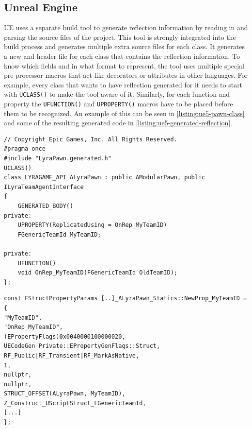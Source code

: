 \subsection{Unreal Engine}

UE uses a separate build tool to generate reflection information by reading in and parsing the \Cpp source files of the project. This tool is strongly integrated into the build process and generates multiple extra source files for each class. It generates a new \Cpp and header file for each class that contains the reflection information. To know which fields and in what format to represent, the tool uses multiple special pre-processor macros that act like decorators or attributes in other languages. For example, every class that wants to have reflection generated for it needs to start with \verb|UCLASS()| to make the tool aware of it. Similarly, for each function and property the \verb|UFUNCTION()| and \verb|UPROPERTY()| macros have to be placed before them to be recognized. An example of this can be seen in \autoref{listing:ue5-pawn-class} and some of the resulting generated code in \autoref{listing:ue5-generated-reflection}.


\begin{listing}
    \begin{verbatim}
// Copyright Epic Games, Inc. All Rights Reserved.
#pragma once
#include "LyraPawn.generated.h"
UCLASS()
class LYRAGAME_API ALyraPawn : public AModularPawn, public ILyraTeamAgentInterface
{
	GENERATED_BODY()
private:
	UPROPERTY(ReplicatedUsing = OnRep_MyTeamID)
	FGenericTeamId MyTeamID;

private:
	UFUNCTION()
	void OnRep_MyTeamID(FGenericTeamId OldTeamID);
};
    \end{verbatim}
    \caption{Sections from a UE5 pawn class (Lyra demo project)}
    \label{listing:ue5-pawn-class}
\end{listing}

\begin{listing}
    \begin{verbatim}
const FStructPropertyParams [..]_ALyraPawn_Statics::NewProp_MyTeamID = {
"MyTeamID",
"OnRep_MyTeamID",
(EPropertyFlags)0x0040000100000020,
UECodeGen_Private::EPropertyGenFlags::Struct,
RF_Public|RF_Transient|RF_MarkAsNative,
1,
nullptr,
nullptr,
STRUCT_OFFSET(ALyraPawn, MyTeamID),
Z_Construct_UScriptStruct_FGenericTeamId,
[...]
};
    \end{verbatim}
    \caption{Section from the generated reflection code for the same class as in \autoref{listing:ue5-pawn-class}}
    \label{listing:ue5-generated-reflection}
\end{listing}


